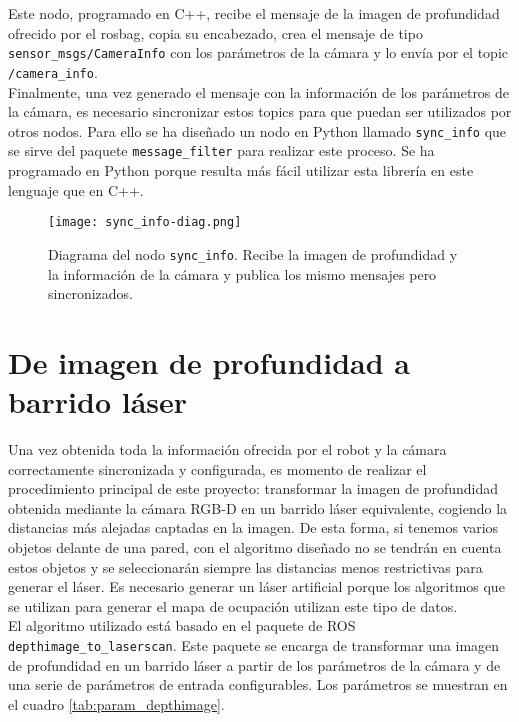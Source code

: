 Este nodo, programado en C++, recibe el mensaje de la imagen de profundidad ofrecido por el rosbag, copia su encabezado, crea el mensaje de tipo \texttt{sensor\_msgs/\-CameraInfo} con los parámetros de la cámara y lo envía por el topic \texttt{/camera\_info}.\\

Finalmente, una vez generado el mensaje con la información de los parámetros de la cámara, es necesario sincronizar estos topics para que puedan ser utilizados por otros nodos. Para ello se ha diseñado un nodo en Python llamado \texttt{sync\_info} que se sirve del paquete \texttt{message\_filter} para realizar este proceso. Se ha programado en Python porque resulta más fácil utilizar esta librería en este lenguaje que en C++.\\

\begin{figure}[h]
	\begin{center} 
		\texttt{[image: sync\_info-diag.png]}
	\end{center}
	\caption{Diagrama del nodo \texttt{sync\_info}. Recibe la imagen de profundidad y la información de la cámara y publica los mismo mensajes pero sincronizados.}
	\label{fig:sync_info}
\end{figure}

\section{De imagen de profundidad a barrido láser} \label{depthimage_section}

Una vez obtenida toda la información ofrecida por el robot y la cámara correctamente sincronizada y configurada, es momento de realizar el procedimiento principal de este proyecto: transformar la imagen de profundidad obtenida mediante la cámara RGB-D en un barrido láser equivalente, cogiendo la distancias más alejadas captadas en la imagen. De esta forma, si tenemos varios objetos delante de una pared, con el algoritmo diseñado no se tendrán en cuenta estos objetos y se seleccionarán siempre las distancias menos restrictivas para generar el láser. Es necesario generar un láser artificial porque los algoritmos que se utilizan para generar el mapa de ocupación utilizan este tipo de datos.\\

El algoritmo utilizado está basado en el paquete de ROS \texttt{depthimage\-\_to\_\-laserscan}. Este paquete se encarga de transformar una imagen de profundidad en un barrido láser a partir de los parámetros de la cámara y de una serie de parámetros de entrada configurables. Los parámetros se muestran en el cuadro \ref{tab:param_depthimage}.

